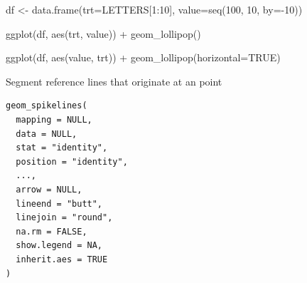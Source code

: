 \documentclass[a4paper]{book}
\begin{document}
%
\begin{Examples}
\begin{ExampleCode}
df <- data.frame(trt=LETTERS[1:10],
                 value=seq(100, 10, by=-10))

ggplot(df, aes(trt, value)) + geom_lollipop()

ggplot(df, aes(value, trt)) + geom_lollipop(horizontal=TRUE)
\end{ExampleCode}
\end{Examples}
%
\begin{Description}
Segment reference lines that originate at an point
\end{Description}
%
\begin{Usage}
\begin{verbatim}
geom_spikelines(
  mapping = NULL,
  data = NULL,
  stat = "identity",
  position = "identity",
  ...,
  arrow = NULL,
  lineend = "butt",
  linejoin = "round",
  na.rm = FALSE,
  show.legend = NA,
  inherit.aes = TRUE
)
\end{verbatim}
\end{Usage}
%
\end{document}
